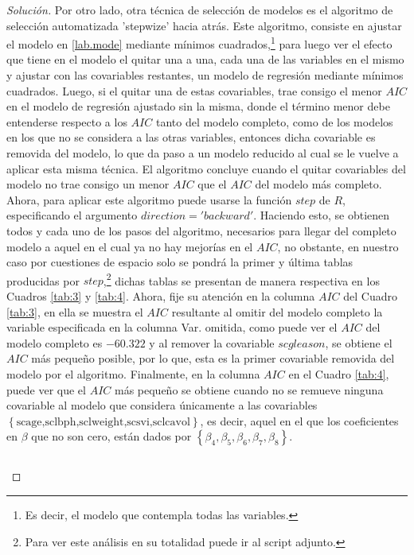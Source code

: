 \documentclass[10.5pt,notitlepage]{article}
\newenvironment{solucion}
  {\begin{proof}[Solución]}
  {\end{proof}}
\newcommand{\kis}[1]{\left\{ #1 \right\}}
\theoremstyle{plain}
\begin{document}
\begin{solucion}
Por otro lado, otra técnica de selección de modelos es el algoritmo de selección automatizada 'stepwize' hacia atrás. Este algoritmo, consiste en ajustar el modelo en \eqref{lab.mode} mediante mínimos cuadrados,\footnote{Es decir, el modelo que contempla todas las variables.} para luego ver el efecto que tiene en el modelo el quitar una a una, cada una de las variables en el mismo y ajustar con las covariables restantes, un modelo de regresión mediante mínimos cuadrados. Luego, si el quitar una de estas covariables, trae consigo el menor \(AIC\) en el modelo de regresión ajustado sin la misma, donde el término menor debe entenderse respecto a los \(AIC\) tanto del modelo completo, como de los modelos en los que no se considera a las otras variables, entonces dicha covariable es removida del modelo, lo que da paso a un modelo reducido al cual se le vuelve a aplicar esta misma técnica. El algoritmo concluye cuando el quitar covariables del modelo no trae consigo un menor \(AIC\) que el \(AIC\) del modelo más completo. Ahora, para aplicar este algoritmo puede usarse la función \(step\) de \(R\), especificando el argumento \(direction = 'backward'\). Haciendo esto, se obtienen todos y cada uno de los pasos del algoritmo, necesarios para llegar del completo modelo a aquel en el cual ya no hay mejorías en el \(AIC\), no obstante, en nuestro caso por cuestiones de espacio solo se pondrá la primer y última tablas producidas por \(step\),\footnote{Para ver este análisis en su totalidad puede ir al script adjunto.} dichas tablas se presentan de manera respectiva en los Cuadros \ref{tab:3} y \ref{tab:4}. Ahora, fije su atención en la columna \(AIC\) del Cuadro \ref{tab:3}, en ella se muestra el \(AIC\) resultante al omitir del modelo completo la variable especificada en la columna Var. omitida, como puede ver el \(AIC\) del modelo completo es \(-60.322\) y al remover la covariable \(scgleason\), se obtiene el \(AIC\) más pequeño posible, por lo que, esta es la primer covariable removida del modelo por el algoritmo. Finalmente, en la columna \(AIC\) en el Cuadro \ref{tab:4}, puede ver que el \(AIC\) más pequeño se obtiene cuando no se remueve ninguna covariable al modelo que considera únicamente a las covariables \(\kis{\text{scage,sclbph,sclweight,scsvi,sclcavol}}\), es decir, aquel en el que los coeficientes en \(\beta\) que no son cero, están dados por \(\kis{\beta_4,\beta_5,\beta_6,\beta_7,\beta_8}\).  
\begin{table}[htb]
    \centering
        \centering
        \begin{tabular}{@{}l@{\hskip 0.3in}r@{\hskip 0.3in}r@{\hskip 0.3in}r@{\hskip 0.3in}r@{}}

\end{tabular}
\end{table}
\end{solucion}
\end{document}
